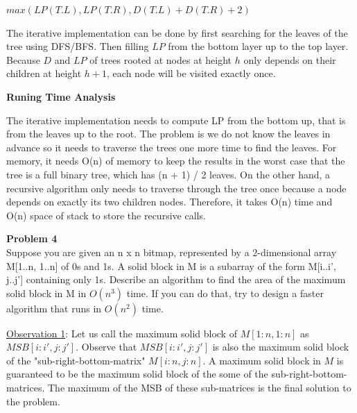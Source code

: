 \documentclass[12pt,article]{article}
\newenvironment{problem}[2][Problem]
    { \begin{mdframed}[backgroundcolor=gray!20] \textbf{#1 #2} \\}
    {  \end{mdframed}}
\begin{document}
\begin{algorithm}
\caption{$LP(T)$}\label{alg:q3-LP}
\begin{algorithmic}
    \EndIf

    \EndIf

    \Return $max(LP(T.L), LP(T.R), D(T.L) + D(T.R) + 2)$
\end{algorithmic}
\end{algorithm}

The iterative implementation can be done by first searching for the leaves of the tree using DFS/BFS. Then filling $LP$ from the bottom layer up to the top layer. Because $D$ and $LP$ of trees rooted at nodes at height $h$ only depends on their children at height $h + 1$, each node will be visited exactly once. 

\textbf{Runing Time Analysis}

The iterative implementation needs to compute LP from the bottom up, that is from the leaves up to the root. The problem is we do not know the leaves in advance so it needs to traverse the trees one more time to find the leaves. For memory, it needs O(n) of memory to keep the results in the worst case that the tree is a full binary tree, which has (n + 1) / 2 leaves. On the other hand, a recursive algorithm only needs to traverse through the tree once because a node depends on exactly its two children nodes. Therefore, it takes O(n) time and O(n) space of stack to store the recursive calls.

\newpage
\begin{problem}{4} 
Suppose you are given an n x n bitmap, represented by a 2-dimensional array M[1..n, 1..n] of 0s and 1s. A solid block in M is a subarray of the form M[i..i', j..j'] containing only 1s. Describe an algorithm to find the area of the maximum solid block in M in $O(n^3)$ time. If you can do that, try to design a faster algorithm that runs in $O(n^2)$ time.
\end{problem}

\underline{Observation 1}: Let us call the maximum solid block of $M[1:n,1:n]$ as $MSB[i:i',j:j']$. Observe that $MSB[i:i',j:j']$ is also the maximum solid block of the "sub-right-bottom-matrix" $M[i:n,j:n]$. A maximum solid block in $M$ is guaranteed to be the maximum solid block of the some of the sub-right-bottom-matrices. The maximum of the MSB of these sub-matrices is the final solution to the problem.
\end{document}

